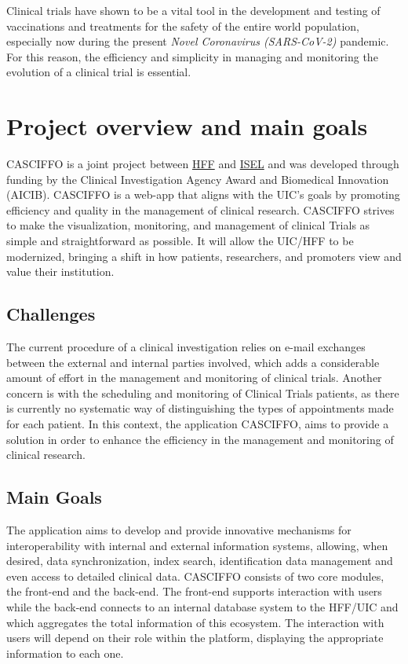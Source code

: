 Clinical trials have shown to be a vital tool in the development and testing of vaccinations and treatments for the safety of the entire world population, especially now during the present \textit{Novel Coronavirus (SARS-CoV-2)} pandemic. For this reason, the efficiency and simplicity in managing and monitoring the evolution of a clinical trial is essential.  

\section{Project overview and main goals}\label{ch:intro:sec:casciffo}

CASCIFFO is a joint project between \href{https://hff.min-saude.pt/}{HFF} and \href{https://www.isel.pt/}{ISEL} and was developed through funding by the Clinical Investigation Agency Award and Biomedical Innovation (AICIB).  
CASCIFFO is a web-app that aligns with the UIC's goals by promoting efficiency and quality in the management of clinical research.
CASCIFFO strives to make the visualization, monitoring, and management of clinical Trials as simple and straightforward as possible.   
It will allow the UIC/HFF to be modernized, bringing a shift in how patients, researchers, and promoters view and value their institution.  

\subsection{Challenges}
The current procedure of a clinical investigation relies on e-mail exchanges between the external and internal parties involved, which adds a considerable amount of effort in the management and monitoring of clinical trials. Another concern is with the scheduling and monitoring of Clinical Trials patients, as there is currently no systematic way of distinguishing the types of appointments made for each patient.  
In this context, the application CASCIFFO, aims to provide a solution in order to enhance the efficiency in the management and monitoring of clinical research.

\subsection{Main Goals}
The application aims to develop and provide innovative mechanisms for interoperability with internal and external information systems, allowing, when desired, data synchronization, index search, identification data management and even access to detailed clinical data. 
CASCIFFO consists of two core modules, the front-end and the back-end. The front-end supports interaction with users while the back-end connects to an internal database system to the HFF/UIC and which aggregates the total information of this ecosystem.  
The interaction with users will depend on their role within the platform, displaying the appropriate information to each one. 


